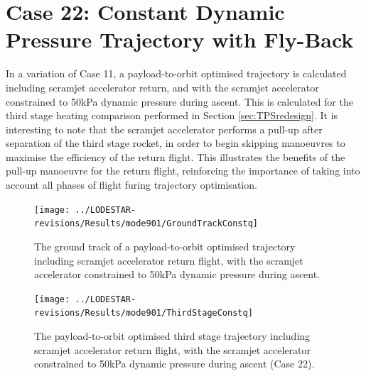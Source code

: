 \section{Case 22: Constant Dynamic Pressure Trajectory with Fly-Back}\label{sec:constqReturn}
In a variation of Case 11, a payload-to-orbit optimised trajectory is calculated including scramjet accelerator return, and with the scramjet accelerator constrained to 50kPa dynamic pressure during ascent. This is calculated for the third stage heating comparison performed in Section \ref{sec:TPSredesign}. It is interesting to note that the scramjet accelerator performs a pull-up after separation of the third stage rocket, in order to begin skipping manoeuvres to maximise the efficiency of the return flight. This illustrates the benefits of the pull-up manoeuvre for the return flight, reinforcing the importance of taking into account all phases of flight furing trajectory optimisation. 
\begin{figure}[!h]
\centering
\texttt{[image: ../LODESTAR-revisions/Results/mode901/GroundTrackConstq]}
\caption{The ground track of a payload-to-orbit optimised trajectory including scramjet accelerator return flight, with the scramjet accelerator constrained to 50kPa dynamic pressure during ascent.}
\label{fig:GroundTrackConstqReturn}
\end{figure}
\begin{figure}[!h]
\centering
\texttt{[image: ../LODESTAR-revisions/Results/mode901/ThirdStageConstq]}
\caption{The payload-to-orbit optimised third stage trajectory including scramjet accelerator return flight, with the scramjet accelerator constrained to 50kPa dynamic pressure during ascent (Case 22).}
\label{fig:ThirdStageConstqReturn}
\end{figure}
